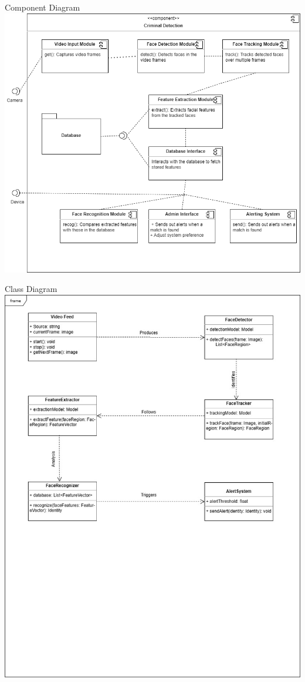 \begin{frame}{Component Diagram}
	\centering
	\includegraphics[height=0.8\textheight]{components/images/component.png}
\end{frame}

\begin{frame}{Class Diagram}
	\centering
	\includegraphics[height=1.3\textheight]{components/images/class.jpeg}
\end{frame}

